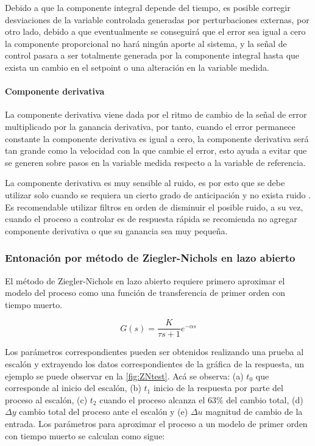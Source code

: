 				Debido a que la componente integral depende del tiempo, es posible corregir desviaciones de la variable controlada generadas por perturbaciones externas, por otro lado, debido a que eventualmente se conseguirá que el error sea igual a cero la componente proporcional no hará ningún aporte al sistema, y la señal de control pasara a ser totalmente generada por la componente integral hasta que exista un cambio en el setpoint o una alteración en la variable medida.

			\paragraph{Componente derivativa}
			
				La componente derivativa viene dada por el ritmo de cambio de la señal de error multiplicado por la ganancia derivativa, por tanto, cuando el error permanece constante la componente derivativa es igual a cero, la componente derivativa será tan grande como la velocidad con la que cambie el error, esto ayuda a evitar que se generen sobre pasos en la variable medida respecto a la variable de referencia.
				
				La componente derivativa es muy sensible al ruido, es por esto que se debe utilizar solo cuando se requiera un cierto grado de anticipación y no exista ruido \Parencite{smith1985principles}. Es recomendable utilizar filtros en orden de disminuir el posible ruido, a su vez, cuando el proceso a controlar es de respuesta rápida se recomienda no agregar componente derivativa o que su ganancia sea muy pequeña.
				
		\subsubsection{Entonación por método de Ziegler-Nichols en lazo abierto}
			
			El método de Ziegler-Nichols en lazo abierto requiere primero aproximar el modelo del proceso como una función de transferencia de primer orden con tiempo muerto.
			
			\begin{equation}\label{eq:firstorderProcess}
				G(s) = \frac{K}{\tau s + 1} e^{-\alpha s}
			\end{equation}
			
			Los parámetros correspondientes pueden ser obtenidos realizando una prueba al escalón y extrayendo los datos correspondientes de la gráfica de la respuesta, un ejemplo se puede observar en la \cref{fig:ZNtest}. Acá se observa: (a) $t_{0}$ que corresponde al inicio del escalón, (b) $t_{1}$ inicio de la respuesta por parte del proceso al escalón, (c) $t_{2}$ cuando el proceso alcanza el 63\% del cambio total, (d) $\Delta y$ cambio total del proceso ante el escalón y (e) $\Delta u$ magnitud de cambio de la entrada. Los parámetros para aproximar el proceso a un modelo de primer orden con tiempo muerto se calculan como sigue:
			
